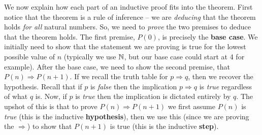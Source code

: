 \documentclass[main.tex]{subfiles}
\begin{document}

We now explain how each part of an inductive proof fits into the theorem. First notice that the theorem is a rule of inference -- we are \textit{deducing} that the theorem holds \textit{for all} natural numbers. So, we need to \textit{prove} the two premises to deduce that the theorem holds. The first premise, \(P(0)\), is precisely the \textbf{base case}. We initially need to show that the statement we are proving is true for the lowest possible value of \(n\) (typically we use \(\mathbb{N}\), but our base case could start at 4 for example). After the base case, we need to show the second premise, that \(P(n) \Rightarrow P(n+1)\). If we recall the truth table for \(p \Rightarrow q\), then we recover the hypothesis. Recall that if \(p\) is \textit{false} then the implication \(p \Rightarrow q\) is \textit{true} regardless of what \(q\) is. Now, if \(p\) is \textit{true} then the implication is dictated entirely by \(q\). The upshot of this is that to prove \(P(n) \Rightarrow P(n+1)\) we first assume \(P(n)\) is \textit{true} (this is the inductive \textbf{hypothesis}), then we use this (since we are proving the \(\Rightarrow\)) to show that \(P(n+1)\) is true (this is the inductive \textbf{step}). 
\end{document}
